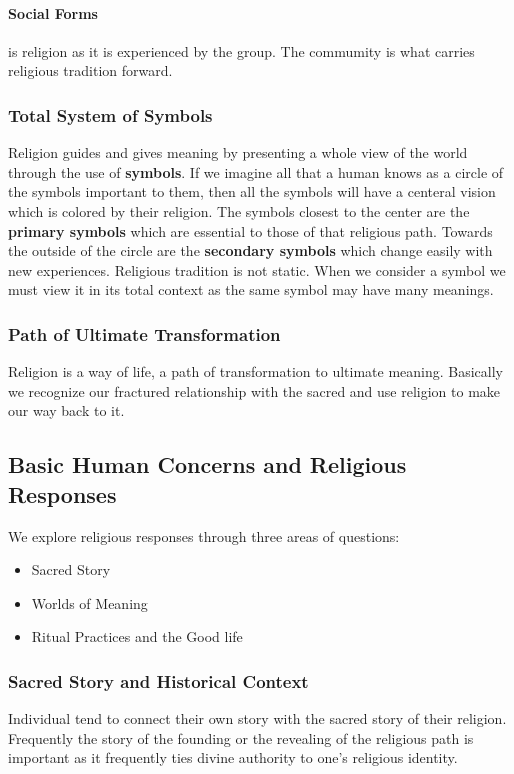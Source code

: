 \documentclass{article}
\begin{document}
\paragraph{Social Forms}
\label{par:social_forms}
is religion as it is experienced by the group. The commumity is what carries religious tradition forward.

\subsubsection{Total System of Symbols}
\label{ssub:total_system_of_symbols}
Religion guides and gives meaning by presenting a whole view of the world through the use of \textbf{symbols}. If we imagine all that a human knows as a circle of the symbols important to them, then all the symbols will have a centeral vision which is colored by their religion. The symbols closest to the center are the \textbf{primary symbols} which are essential to those of that religious path. Towards the outside of the circle are the \textbf{secondary symbols} which change easily with new experiences. Religious tradition is not static. When we consider a symbol we must view it in its total context as the same symbol may have many meanings.

\subsubsection{Path of Ultimate Transformation}
\label{ssub:path_of_ultimate_transformation}
Religion is a way of life, a path of transformation to ultimate meaning. Basically we recognize our fractured relationship with the sacred and use religion to make our way back to it.

\subsection{Basic Human Concerns and Religious Responses}
\label{sub:basic_human_concerns_and_religious_responses}
We explore religious responses through three areas of questions:
\begin{itemize}
	\item Sacred Story
	\item Worlds of Meaning
	\item Ritual Practices and the Good life
\end{itemize}

\subsubsection{Sacred Story and Historical Context}
\label{ssub:sacred_story_and_historical_context}
Individual tend to connect their own story with the sacred story of their religion. Frequently the story of the founding or the revealing of the religious path is important as it frequently ties divine authority to one's religious identity.
\end{document}
